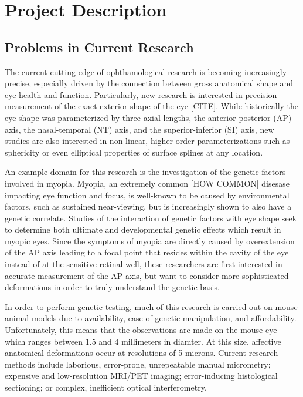 \documentclass{article}
\begin{document}

\setcounter{tocdepth}{2}
\tableofcontents
\newpage

\section{Project Description}
\label{sec:project-description}

\subsection{Problems in Current Research}
\label{sec:probl-curr-rese}

The current cutting edge of ophthamological research is becoming
increasingly precise, especially driven by the connection between
gross anatomical shape and eye health and function. Particularly, new
research is interested in precision measurement of the exact exterior
shape of the eye [CITE]. While historically the eye shape was
parameterized by three axial lengths, the anterior-posterior (AP)
axis, the nasal-temporal (NT) axis, and the superior-inferior (SI)
axis, new studies are also interested in non-linear, higher-order
parameterizations such as sphericity or even elliptical properties of
surface splines at any location.

An example domain for this research is the investigation of the
genetic factors involved in myopia. Myopia, an extremely common [HOW
COMMON] disesase impacting eye function and focus, is well-known to be
caused by environmental factors, such as sustained near-viewing, but
is increasingly shown to also have a genetic
correlate\cite{zhou99:genes,zhou99:models,schmucker04}. Studies of the
interaction of genetic factors with eye shape seek to determine both
ultimate and developmental genetic effects which result in myopic
eyes. Since the symptoms of myopia are directly caused by
overextension of the AP axis leading to a focal point that resides
within the cavity of the eye instead of at the sensitive retinal well,
these researchers are first interested in accurate measurement of the
AP axis\cite{wallman04}, but want to consider more sophisticated
deformations in order to truly understand the genetic
basis\cite{schaeffel04}.

In order to perform genetic testing, much of this research is carried
out on mouse animal models due to availability, ease of genetic
manipulation, and affordability\cite{schaeffel04}. Unfortunately, this
means that the observations are made on the mouse eye which ranges
between 1.5 and 4 millimeters in diamter. At this size, affective
anatomical deformations occur at resolutions of 5 microns. Current
research methods include laborious, error-prone, unrepeatable manual
micrometry\cite{wallman04}; expensive and low-resolution MRI/PET
imaging\cite{atchison04}; error-inducing histological
sectioning\cite{schaeffel04}; or complex, inefficient optical
interferometry\cite{schaeffel04,guggenheim04}.
\end{document}
